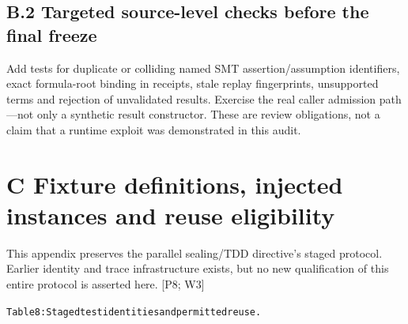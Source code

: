 \documentclass{article}
\begin{document}
\subsection*{B.2 Targeted source-level checks before the final freeze}

Add tests for duplicate or colliding named SMT assertion/assumption identifiers, exact formula-root
binding in receipts, stale replay fingerprints, unsupported terms and rejection of unvalidated results.
Exercise the real caller admission path—not only a synthetic result constructor. These are review
obligations, not a claim that a runtime exploit was demonstrated in this audit.

\section*{C Fixture definitions, injected instances and reuse eligibility}
This appendix preserves the parallel sealing/TDD directive’s staged protocol. Earlier identity and
trace infrastructure exists, but no new qualification of this entire protocol is asserted here. [P8; W3]

\begingroup\fontsize{7}{8.4}\selectfont
\begin{alltt}
Table 8: Staged test identities and permitted reuse.
\end{alltt}\endgroup
\end{document}

